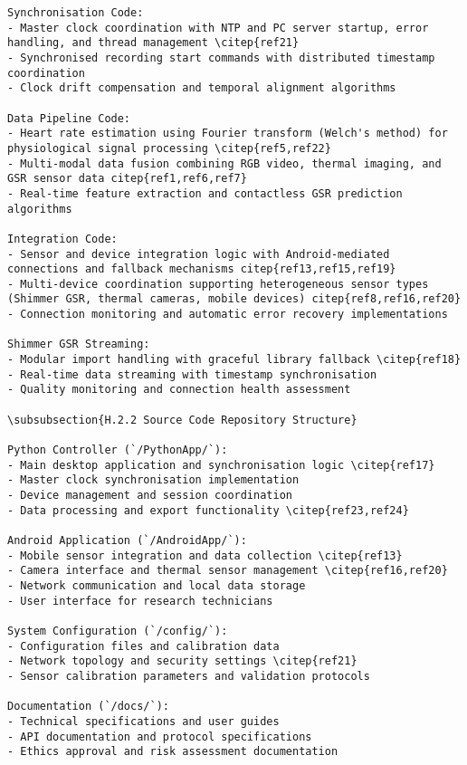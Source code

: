 \begin{verbatim}
Synchronisation Code:
- Master clock coordination with NTP and PC server startup, error handling, and thread management \citep{ref21}
- Synchronised recording start commands with distributed timestamp coordination
- Clock drift compensation and temporal alignment algorithms

Data Pipeline Code:
- Heart rate estimation using Fourier transform (Welch's method) for physiological signal processing \citep{ref5,ref22}
- Multi-modal data fusion combining RGB video, thermal imaging, and GSR sensor data citep{ref1,ref6,ref7}
- Real-time feature extraction and contactless GSR prediction algorithms

Integration Code:
- Sensor and device integration logic with Android-mediated connections and fallback mechanisms citep{ref13,ref15,ref19}
- Multi-device coordination supporting heterogeneous sensor types (Shimmer GSR, thermal cameras, mobile devices) citep{ref8,ref16,ref20}
- Connection monitoring and automatic error recovery implementations

Shimmer GSR Streaming:
- Modular import handling with graceful library fallback \citep{ref18}
- Real-time data streaming with timestamp synchronisation
- Quality monitoring and connection health assessment

\subsubsection{H.2.2 Source Code Repository Structure}

Python Controller (`/PythonApp/`):
- Main desktop application and synchronisation logic \citep{ref17}
- Master clock synchronisation implementation
- Device management and session coordination
- Data processing and export functionality \citep{ref23,ref24}

Android Application (`/AndroidApp/`):
- Mobile sensor integration and data collection \citep{ref13}
- Camera interface and thermal sensor management \citep{ref16,ref20}
- Network communication and local data storage
- User interface for research technicians

System Configuration (`/config/`):
- Configuration files and calibration data
- Network topology and security settings \citep{ref21}
- Sensor calibration parameters and validation protocols

Documentation (`/docs/`):
- Technical specifications and user guides
- API documentation and protocol specifications
- Ethics approval and risk assessment documentation


\end{verbatim}
